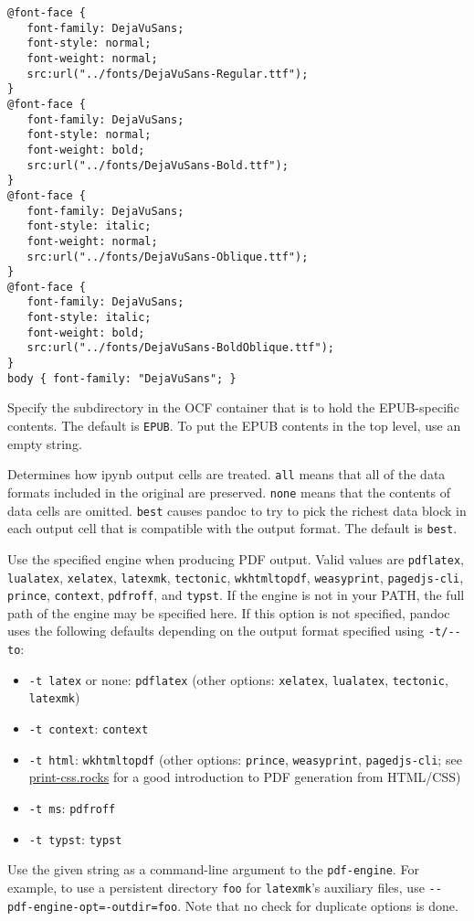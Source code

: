 \documentclass[
  a4paper,
]{article}
\providecommand{\tightlist}{%
  \setlength{\itemsep}{0pt}\setlength{\parskip}{0pt}}
\begin{document}
\begin{description}
\begin{verbatim}
@font-face {
   font-family: DejaVuSans;
   font-style: normal;
   font-weight: normal;
   src:url("../fonts/DejaVuSans-Regular.ttf");
}
@font-face {
   font-family: DejaVuSans;
   font-style: normal;
   font-weight: bold;
   src:url("../fonts/DejaVuSans-Bold.ttf");
}
@font-face {
   font-family: DejaVuSans;
   font-style: italic;
   font-weight: normal;
   src:url("../fonts/DejaVuSans-Oblique.ttf");
}
@font-face {
   font-family: DejaVuSans;
   font-style: italic;
   font-weight: bold;
   src:url("../fonts/DejaVuSans-BoldOblique.ttf");
}
body { font-family: "DejaVuSans"; }
\end{verbatim}
\item[\texttt{-\/-epub-subdirectory=}\emph{DIRNAME}]
Specify the subdirectory in the OCF container that is to hold the
EPUB-specific contents. The default is \texttt{EPUB}. To put the EPUB
contents in the top level, use an empty string.
\item[\texttt{-\/-ipynb-output=all\textbar{}none\textbar{}best}]
Determines how ipynb output cells are treated. \texttt{all} means that
all of the data formats included in the original are preserved.
\texttt{none} means that the contents of data cells are omitted.
\texttt{best} causes pandoc to try to pick the richest data block in
each output cell that is compatible with the output format. The default
is \texttt{best}.
\item[\texttt{-\/-pdf-engine=}\emph{PROGRAM}]
Use the specified engine when producing PDF output. Valid values are
\texttt{pdflatex}, \texttt{lualatex}, \texttt{xelatex},
\texttt{latexmk}, \texttt{tectonic}, \texttt{wkhtmltopdf},
\texttt{weasyprint}, \texttt{pagedjs-cli}, \texttt{prince},
\texttt{context}, \texttt{pdfroff}, and \texttt{typst}. If the engine is
not in your PATH, the full path of the engine may be specified here. If
this option is not specified, pandoc uses the following defaults
depending on the output format specified using \texttt{-t/-\/-to}:

\begin{itemize}
\tightlist
\item
  \texttt{-t\ latex} or none: \texttt{pdflatex} (other options:
  \texttt{xelatex}, \texttt{lualatex}, \texttt{tectonic},
  \texttt{latexmk})
\item
  \texttt{-t\ context}: \texttt{context}
\item
  \texttt{-t\ html}: \texttt{wkhtmltopdf} (other options:
  \texttt{prince}, \texttt{weasyprint}, \texttt{pagedjs-cli}; see
  \href{https://print-css.rocks}{print-css.rocks} for a good
  introduction to PDF generation from HTML/CSS)
\item
  \texttt{-t\ ms}: \texttt{pdfroff}
\item
  \texttt{-t\ typst}: \texttt{typst}
\end{itemize}
\item[\texttt{-\/-pdf-engine-opt=}\emph{STRING}]
Use the given string as a command-line argument to the
\texttt{pdf-engine}. For example, to use a persistent directory
\texttt{foo} for \texttt{latexmk}'s auxiliary files, use
\texttt{-\/-pdf-engine-opt=-outdir=foo}. Note that no check for
duplicate options is done.
\end{description}
\end{document}
